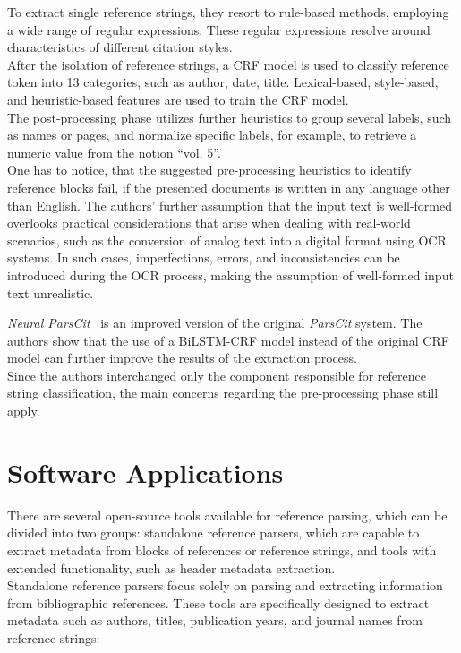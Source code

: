 To extract single reference strings, they resort to rule-based methods, employing a wide range of regular expressions. These regular expressions resolve around characteristics of different citation styles.\\
After the isolation of reference strings, a CRF model is used to classify reference token into 13 categories, such as author, date, title. Lexical-based, style-based, and heuristic-based features are used to train the CRF model.\\
The post-processing phase utilizes further heuristics to group several labels, such as names or pages, and normalize specific labels, for example, to retrieve a numeric value from the notion \enquote{vol. 5}.\\
One has to notice, that the suggested pre-processing heuristics to identify reference blocks fail, if the presented documents is written in any language other than English. The authors' further assumption that the input text is well-formed overlooks practical considerations that arise when dealing with real-world scenarios, such as the conversion of analog text into a digital format using OCR systems. In such cases, imperfections, errors, and inconsistencies can be introduced during the OCR process, making the assumption of well-formed input text unrealistic.\par
\textit{Neural ParsCit}~\cite{prasad2018neural} is an improved version of the original \textit{ParsCit} system. The authors show that the use of a BiLSTM-CRF model instead of the original CRF model can further improve the results of the extraction process.\\
Since the authors interchanged only the component responsible for reference string classification, the main concerns regarding the pre-processing phase still apply.
\newpage

\section{Software Applications}
There are several open-source tools available for reference parsing, which can be divided into two groups: standalone reference parsers, which are capable to extract metadata from blocks of references or reference strings, and tools with extended functionality, such as header metadata extraction.\\
Standalone reference parsers focus solely on parsing and extracting information from bibliographic references. These tools are specifically designed to extract metadata such as authors, titles, publication years, and journal names from reference strings:

